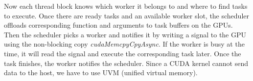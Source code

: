Now each thread block knows which worker it belongs to and where to find tasks to execute.
Once there are ready tasks and an available worker slot, the scheduler offloads corresponding function and arguments to task buffers on the GPUs.
Then the scheduler picks a worker and notifies it by writing a signal to the GPU using the non-blocking copy {\em cudaMemcpyCpyAsync}.
If the worker is busy at the time, it will read the signal  and execute the corresponding task later.
Once the task finishes, the worker notifies the scheduler.
Since a CUDA kernel cannot send data to the host, we have to use UVM (unified virtual memory).

